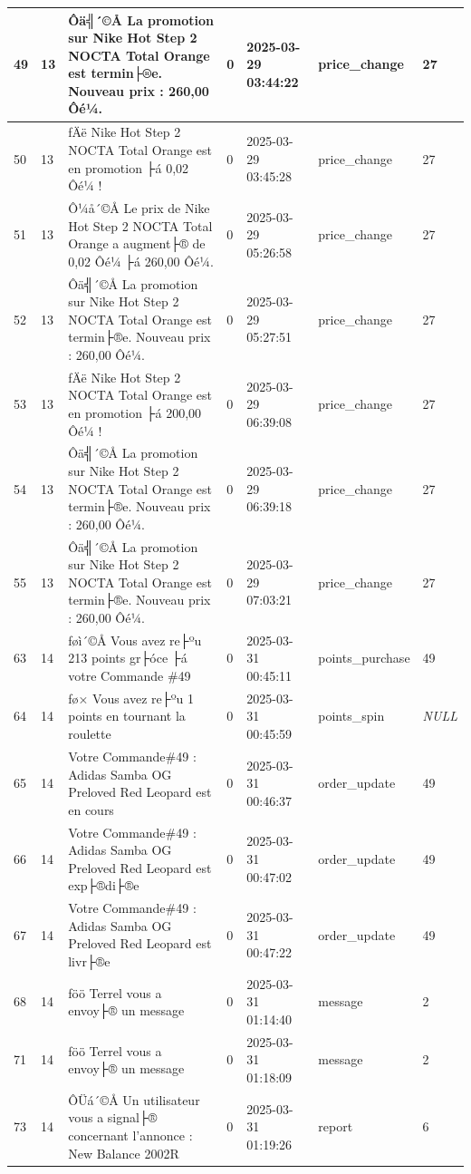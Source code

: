 \begin{longtable}{|l|l|l|l|l|l|l|}
49 & 13 & Ôä╣´©Å La promotion sur Nike Hot Step 2 NOCTA Total Orange est termin├®e. Nouveau prix : 260,00 Ôé¼. & 0 & 2025-03-29 03:44:22 & price\_change & 27 \\ \hline 
50 & 13 & ­ƒÄë Nike Hot Step 2 NOCTA Total Orange est en promotion ├á 0,02 Ôé¼ ! & 0 & 2025-03-29 03:45:28 & price\_change & 27 \\ \hline 
51 & 13 & Ô¼å´©Å Le prix de Nike Hot Step 2 NOCTA Total Orange a augment├® de 0,02 Ôé¼ ├á 260,00 Ôé¼. & 0 & 2025-03-29 05:26:58 & price\_change & 27 \\ \hline 
52 & 13 & Ôä╣´©Å La promotion sur Nike Hot Step 2 NOCTA Total Orange est termin├®e. Nouveau prix : 260,00 Ôé¼. & 0 & 2025-03-29 05:27:51 & price\_change & 27 \\ \hline 
53 & 13 & ­ƒÄë Nike Hot Step 2 NOCTA Total Orange est en promotion ├á 200,00 Ôé¼ ! & 0 & 2025-03-29 06:39:08 & price\_change & 27 \\ \hline 
54 & 13 & Ôä╣´©Å La promotion sur Nike Hot Step 2 NOCTA Total Orange est termin├®e. Nouveau prix : 260,00 Ôé¼. & 0 & 2025-03-29 06:39:18 & price\_change & 27 \\ \hline 
55 & 13 & Ôä╣´©Å La promotion sur Nike Hot Step 2 NOCTA Total Orange est termin├®e. Nouveau prix : 260,00 Ôé¼. & 0 & 2025-03-29 07:03:21 & price\_change & 27 \\ \hline 
63 & 14 & ­ƒøì´©Å Vous avez re├ºu 213 points gr├óce ├á votre Commande \#49 & 0 & 2025-03-31 00:45:11 & points\_purchase & 49 \\ \hline 
64 & 14 & ­ƒø× Vous avez re├ºu 1 points en tournant la roulette & 0 & 2025-03-31 00:45:59 & points\_spin & \textit{NULL} \\ \hline 
65 & 14 & Votre Commande\#49 : Adidas Samba OG Preloved Red Leopard est en cours & 0 & 2025-03-31 00:46:37 & order\_update & 49 \\ \hline 
66 & 14 & Votre Commande\#49 : Adidas Samba OG Preloved Red Leopard est exp├®di├®e & 0 & 2025-03-31 00:47:02 & order\_update & 49 \\ \hline 
67 & 14 & Votre Commande\#49 : Adidas Samba OG Preloved Red Leopard est livr├®e & 0 & 2025-03-31 00:47:22 & order\_update & 49 \\ \hline 
68 & 14 & ­ƒöö Terrel vous a envoy├® un message & 0 & 2025-03-31 01:14:40 & message & 2 \\ \hline 
71 & 14 & ­ƒöö Terrel vous a envoy├® un message & 0 & 2025-03-31 01:18:09 & message & 2 \\ \hline 
73 & 14 & ÔÜá´©Å Un utilisateur vous a signal├® concernant l'annonce : New Balance 2002R & 0 & 2025-03-31 01:19:26 & report & 6 \\ \hline 

\end{longtable}
